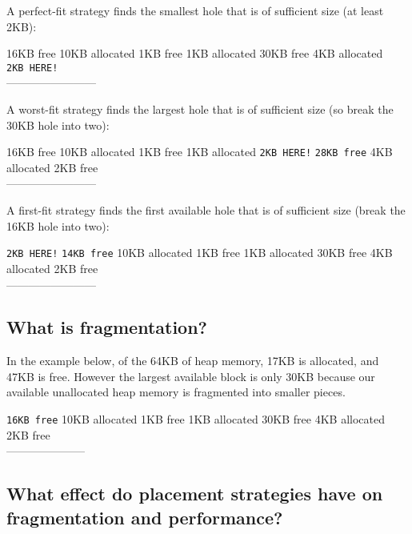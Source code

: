 A perfect-fit strategy finds the smallest hole that is of sufficient
size (at least 2KB):

16KB free \textbar{} 10KB allocated \textbar{} 1KB free \textbar{} 1KB
allocated \textbar{} 30KB free \textbar{} 4KB allocated \textbar{}
\texttt{2KB\ HERE!}\\---\textbar{}---\textbar{}---\textbar{}---\textbar{}---\textbar{}---\textbar{}---\textbar{}---

A worst-fit strategy finds the largest hole that is of sufficient size
(so break the 30KB hole into two):

16KB free \textbar{} 10KB allocated \textbar{} 1KB free \textbar{} 1KB
allocated \textbar{} \texttt{2KB\ HERE!} \textbar{} \texttt{28KB\ free}
\textbar{} 4KB allocated \textbar{} 2KB
free\\---\textbar{}---\textbar{}---\textbar{}---\textbar{}---\textbar{}---\textbar{}---\textbar{}---

A first-fit strategy finds the first available hole that is of
sufficient size (break the 16KB hole into two):

\texttt{2KB\ HERE!} \textbar{} \texttt{14KB\ free} \textbar{} 10KB
allocated \textbar{} 1KB free \textbar{} 1KB allocated \textbar{} 30KB
free \textbar{} 4KB allocated \textbar{} 2KB
free\\---\textbar{}---\textbar{}---\textbar{}---\textbar{}---\textbar{}---\textbar{}---\textbar{}---

\subsection{What is fragmentation?}\label{what-is-fragmentation}

In the example below, of the 64KB of heap memory, 17KB is allocated, and
47KB is free. However the largest available block is only 30KB because
our available unallocated heap memory is fragmented into smaller pieces.

\texttt{16KB\ free} \textbar{} 10KB allocated \textbar{} 1KB free
\textbar{} 1KB allocated \textbar{} 30KB free \textbar{} 4KB allocated
\textbar{} 2KB
free\\---\textbar{}---\textbar{}---\textbar{}---\textbar{}---\textbar{}---\textbar{}---

\subsection{What effect do placement strategies have on fragmentation
and
performance?}\label{what-effect-do-placement-strategies-have-on-fragmentation-and-performance}

